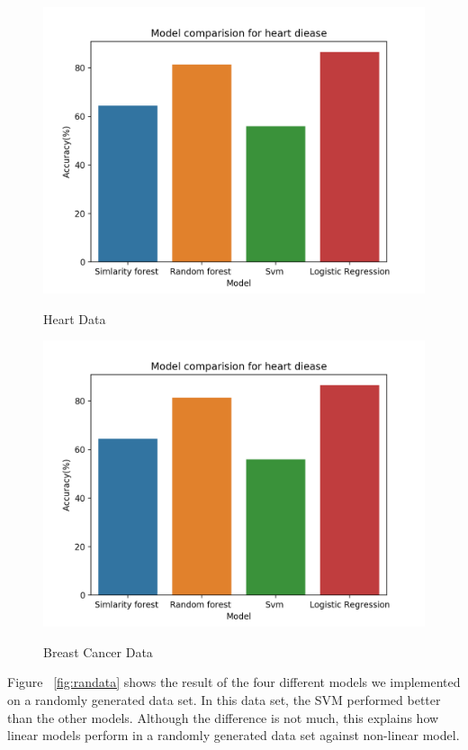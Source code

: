 \documentclass{article}
\begin{document}
\begin{figure}[H]
    \caption{Heart Data}
    \includegraphics{heartdata}
    \label{fig:heartdata}
\end{figure}

\begin{figure}[H]
    \caption{Breast Cancer Data}
    \includegraphics{heartdata}
    \label{fig:breastdata}
\end{figure}

\noindent Figure ~\ref{fig:randata} shows the result of the four different models we implemented on a randomly generated data set. In this data set, the SVM performed better than the other models. Although the difference is not much, this explains how linear models perform in a randomly generated data set against non-linear model.\\
\end{document}
